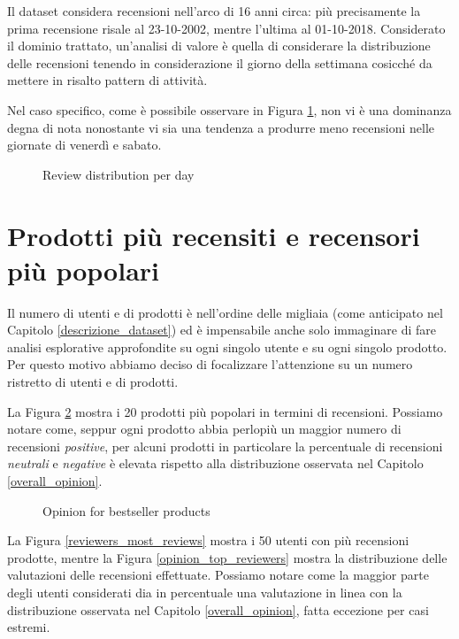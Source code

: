 Il dataset considera recensioni nell'arco di 16 anni circa: più precisamente la prima recensione risale al 23-10-2002, mentre l'ultima al 01-10-2018.
Considerato il dominio trattato, un'analisi di valore è quella di considerare la distribuzione delle recensioni tenendo in considerazione il giorno della settimana cosicché da mettere in risalto pattern di attività. \par 
Nel caso specifico, come è possibile osservare in Figura \ref{review_dist}, non vi è una dominanza degna di nota nonostante vi sia una tendenza a produrre meno recensioni nelle giornate di venerdì e sabato. 

\begin{figure}[H]
  \centering
  
  \caption{Review distribution per day}
  \label{review_dist}
\end{figure}

\section{Prodotti più recensiti e recensori più popolari}
Il numero di utenti e di prodotti è nell'ordine delle migliaia (come anticipato nel Capitolo \ref{descrizione_dataset}) ed è impensabile anche solo immaginare di fare analisi esplorative approfondite su ogni singolo utente e su ogni singolo prodotto. Per questo motivo abbiamo deciso di focalizzare l'attenzione su un numero ristretto di utenti e di prodotti. 

\par

La Figura \ref{opinion_bestseller_products} mostra i 20 prodotti più popolari in termini di recensioni. Possiamo notare come, seppur ogni prodotto abbia perlopiù un maggior numero di recensioni \textit{positive}, per alcuni prodotti in particolare la percentuale di recensioni \textit{neutrali} e \textit{negative} è elevata rispetto alla distribuzione osservata nel Capitolo \ref{overall_opinion}. 

\begin{figure}[H]
  \centering
  
  \caption{Opinion for bestseller products}
  \label{opinion_bestseller_products}
\end{figure}

\par
La Figura \ref{reviewers_most_reviews} mostra i 50 utenti con più recensioni prodotte, mentre la Figura \ref{opinion_top_reviewers} mostra la distribuzione delle valutazioni delle recensioni effettuate. Possiamo notare come la maggior parte degli utenti considerati dia in percentuale una valutazione in linea con la distribuzione osservata nel Capitolo \ref{overall_opinion}, fatta eccezione per casi estremi.

